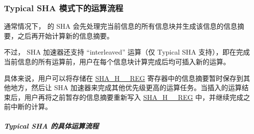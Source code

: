 \documentclass[main\_\_CN.tex]{subfiles}
\begin{document}
\subsubsection{Typical SHA 模式下的运算流程}\label{sec:sha-typical-sha}

通常情况下，\chipname{} 的 SHA 会先处理完当前信息的所有信息块并生成该信息的信息摘要，之后再开始计算新的信息摘要。

不过，\chipname{} SHA 加速器还支持 “interleaved” 运算（仅 Typical SHA 支持），即在完成当前信息的所有运算前，用户在每个信息块计算完成后均可插入新的运算。

具体来说，用户可以将存储在 \hyperref[regdesc:SHAHNREG]{SHA\_H\_\_REG} 寄存器中的信息摘要暂时保存到其他地方，然后让 SHA 加速器来完成其他优先级更高的运算任务。当插入的运算结束后，用户再将之前暂存的信息摘要重新写入 \hyperref[regdesc:SHAHNREG]{SHA\_H\_\_REG} 中，并继续完成之前中断的计算。

\subparagraph{Typical SHA 的具体运算流程}
\end{document}

